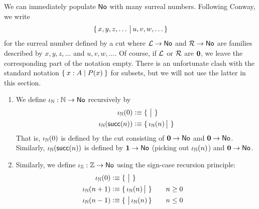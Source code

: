 We can immediately populate $\mathsf{No}$ with many surreal numbers.
Following Conway, we write
\[\{\,x,y,z,\dots\,\big|\,u,v,w,\dots\,\}\]
for the surreal number defined by a cut where $\mathcal{L}\to\mathsf{No}$ and $\mathcal{R}\to\mathsf{No}$ are families described by $x,y,z,\dots$ and $u,v,w,\dots$.
Of course, if $\mathcal{L}$ or $\mathcal{R}$ are $\mathbf{0}$, we leave the corresponding part of the notation empty.
There is an unfortunate clash with the standard notation $\Set{x:A | P(x)}$ for subsets, but we will not use the latter in this section.
\begin{enumerate}
\item We define $\iota_{\mathbb{N}}:\mathbb{N}\to\mathsf{No}$ recursively by
  \begin{align*}
    \iota_{\mathbb{N}}(0) &\vcentcolon\equiv \{\,\,\big|\,\,\}\\
    \iota_\mathbb{N}(\mathsf{succ}(n)) &\vcentcolon\equiv \{\,\iota_\mathbb{N}(n)\,\big|\,\,\}
  \end{align*}
  That is, $\iota_\mathbb{N}(0)$ is defined by the cut consisting of $\mathbf{0}\to\mathsf{No}$ and $\mathbf{0}\to\mathsf{No}$.
  Similarly, $\iota_\mathbb{N}(\mathsf{succ}(n))$ is defined by $\mathbf{1}\to\mathsf{No}$ (picking out $\iota_\mathbb{N}(n)$) and $\mathbf{0}\to\mathsf{No}$.
\item Similarly, we define $\iota_{\mathbb{Z}}:\mathbb{Z}\to\mathsf{No}$ using the sign-case recursion principle:
  \begin{alignat*}{2}
    \iota_{\mathbb{N}}(0) &\vcentcolon\equiv \{\,\,\big|\,\,\}\\
    \iota_\mathbb{N}(n+1) &\vcentcolon\equiv \{\,\iota_\mathbb{N}(n)\,\big|\,\,\} &&\quad n\ge 0\\
    \iota_\mathbb{N}(n-1) &\vcentcolon\equiv \{\,\,\big|\,\iota_\mathbb{N}(n)\,\} &&\quad n\le 0
  \end{alignat*}
\end{enumerate}


